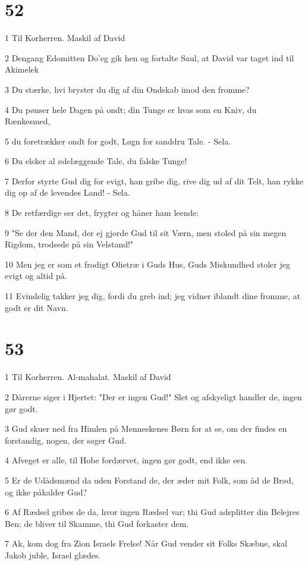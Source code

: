 \chapter{52}

\par 1 Til Korherren. Maskil af David
\par 2 Dengang Edomitten Do'eg gik hen og fortalte Saul, at David var taget ind til Akimelek
\par 3 Du stærke, hvi bryster du dig af din Ondskab imod den fromme?
\par 4 Du pønser hele Dagen på ondt; din Tunge er hvas som en Kniv, du Rænkesmed,
\par 5 du foretrækker ondt for godt, Løgn for sanddru Tale. - Sela.
\par 6 Du elsker al ødelæggende Tale, du falske Tunge!
\par 7 Derfor styrte Gud dig for evigt, han gribe dig, rive dig ud af dit Telt, han rykke dig op af de levendes Land! - Sela.
\par 8 De retfærdige ser det, frygter og håner ham leende:
\par 9 "Se der den Mand, der ej gjorde Gud til sit Værn, men stoled på sin megen Rigdom, trodsede på sin Velstand!"
\par 10 Men jeg er som et frodigt Olietræ i Guds Hus, Guds Miskundhed stoler jeg evigt og altid på.
\par 11 Evindelig takker jeg dig, fordi du greb ind; jeg vidner iblandt dine fromme, at godt er dit Navn.

\chapter{53}

\par 1 Til Korherren. Al-mahalat. Maskil af David
\par 2 Dårerne siger i Hjertet: "Der er ingen Gud!" Slet og afskyeligt handler de, ingen gør godt.
\par 3 Gud skuer ned fra Himlen på Menneskenes Børn for at se, om der findes en forstandig, nogen, der søger Gud.
\par 4 Afveget er alle, til Hobe fordærvet, ingen gør godt, end ikke een.
\par 5 Er de Udådsmænd da uden Forstand de, der æder mit Folk, som åd de Brød, og ikke påkalder Gud?
\par 6 Af Rædsel gribes de da, hvor ingen Rædsel var; thi Gud adsplitter din Belejres Ben; de bliver til Skamme, thi Gud forkaster dem.
\par 7 Ak, kom dog fra Zion Israels Frelse! Når Gud vender sit Folks Skæbne, skal Jakob juble, Israel glædes.

